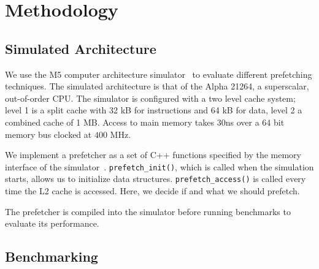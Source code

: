 \section{Methodology}
\label{sec:methodology}

\subsection{Simulated Architecture}

We use the M5 computer architecture simulator~\cite{bib:m5} to evaluate different prefetching techniques.
The simulated architecture is that of the Alpha 21264\cite{bib:alpha-21264}, a superscalar, out-of-order CPU.
The simulator is configured with a two level cache system; level 1 is a split cache with 32 kB for instructions and 64 kB for data, level 2 a combined cache of 1 MB.
Access to main memory takes $30$ns over a $64$ bit memory bus clocked at $400$ MHz.

We implement a prefetcher as a set of C++ functions specified by the memory interface of the simulator~\cite[Section 3.2]{bib:doc}.
\texttt{prefetch\_init()}, which is called when the simulation starts, allows us to initialize data structures.
\texttt{prefetch\_access()} is called every time the L2 cache is accessed.
Here, we decide if and what we should prefetch.

The prefetcher is compiled into the simulator before running benchmarks to evaluate its performance.

\subsection{Benchmarking}

